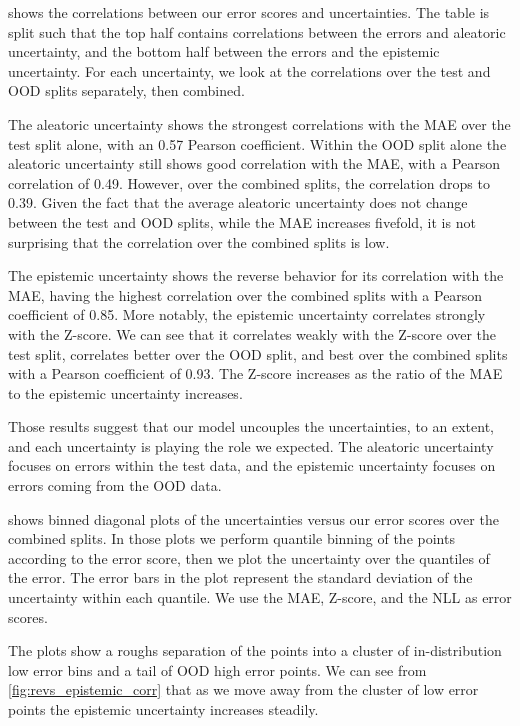  shows the correlations between our error scores and uncertainties. The table is split such that the top half contains correlations between the errors and aleatoric uncertainty, and the bottom half between the errors and the epistemic uncertainty. For each uncertainty, we look at the correlations over the test and OOD splits separately, then combined.  

The aleatoric uncertainty shows the strongest correlations with the MAE over the test split alone, with an 0.57 Pearson coefficient. Within the OOD split alone the aleatoric uncertainty still shows good correlation with the MAE, with a Pearson correlation of 0.49. However, over the combined splits, the correlation drops to 0.39. Given the fact that the average aleatoric uncertainty does not change between the test and OOD splits, while the MAE increases fivefold, it is not surprising that the correlation over the combined splits is low. 

The epistemic uncertainty shows the reverse behavior for its correlation with the MAE, having the highest correlation over the combined splits with a Pearson coefficient of 0.85. More notably, the epistemic uncertainty correlates strongly with the Z-score. We can see that it correlates weakly with the Z-score over the test split, correlates better over the OOD split, and best over the combined splits with a Pearson coefficient of 0.93. The Z-score increases as the ratio of the MAE to the epistemic uncertainty increases. 

Those results suggest that our model uncouples the uncertainties, to an extent, and each uncertainty is playing the role we expected. The aleatoric uncertainty focuses on errors within the test data, and the epistemic uncertainty focuses on errors coming from the OOD data. 

 shows binned diagonal plots of the uncertainties versus our error scores over the combined splits. In those plots we perform quantile binning of the points according to the error score, then we plot the uncertainty over the quantiles of the error. The error bars in the plot represent the standard deviation of the uncertainty within each quantile. We use the MAE, Z-score, and the NLL as error scores. 

The plots show a roughs separation of the points into a cluster of in-distribution low error bins and a tail of OOD high error points. We can see from \cref{fig:revs_epistemic_corr} that as we move away from the cluster of low error points the epistemic uncertainty increases steadily.   

